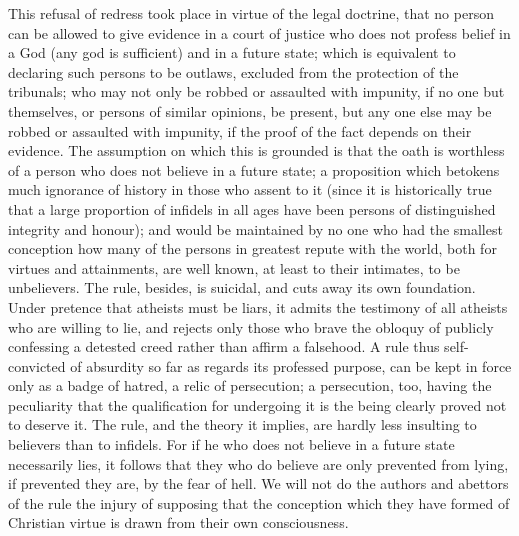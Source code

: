 \documentclass[11pt,openany]{book}
\begin{document}
This refusal of redress took place in virtue of the legal doctrine, that no person can be allowed to give evidence in a court of justice who does not profess belief in a God (any god is sufficient) and in a future state; which is equivalent to declaring such persons to be outlaws, excluded from the protection of the tribunals; who may not only be robbed or assaulted with impunity, if no one but themselves, or persons of similar opinions, be present, but any one else may be robbed or assaulted with impunity, if the proof of the fact depends on their evidence. The assumption on which this is grounded is that the oath is worthless of a person who does not believe in a future state; a proposition which betokens much ignorance of history in those who assent to it (since it is historically true that a large proportion of infidels in all ages have been persons of distinguished integrity and honour); and would be maintained by no one who had the smallest conception how many of the persons in greatest repute with the world, both for virtues and attainments, are well known, at least to their intimates, to be unbelievers. The rule, besides, is suicidal, and cuts away its own foundation. Under pretence that atheists must be liars, it admits the testimony of all atheists who are willing to lie, and rejects only those who brave the obloquy of publicly confessing a detested creed rather than affirm a falsehood. A rule thus self-convicted of absurdity so far as regards its professed purpose, can be kept in force only as a badge of hatred, a relic of persecution; a persecution, too, having the peculiarity that the qualification for undergoing it is the being clearly proved not to deserve it. The rule, and the theory it implies, are hardly less insulting to believers than to infidels. For if he who does not believe in a future state necessarily lies, it follows that they who do believe are only prevented from lying, if prevented they are, by the fear of hell. We will not do the authors and abettors of the rule the injury of supposing that the conception which they have formed of Christian virtue is drawn from their own consciousness.
\end{document}
